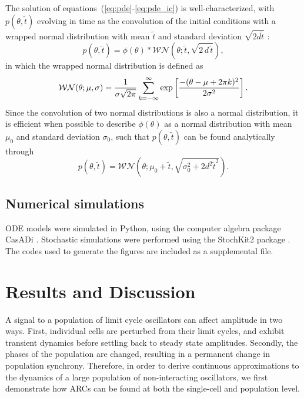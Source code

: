 The solution of equations~(\ref{eq:pde}-\ref{eq:pde_ic}) is well-characterized, with $p(\theta, \tilde{t})$ evolving in time as the convolution of the initial conditions with a wrapped normal distribution with mean $\tilde{t}$ and standard deviation $\sqrt{2d\tilde{t}}$ \cite{Chirikjian2009}:
\begin{equation}
  p(\theta, \tilde{t}) = \phi(\theta) * \mathcal{WN}(\theta; \tilde{t},
  \sqrt{2\, d\, \tilde{t}}),
\end{equation}
in which the wrapped normal distribution \cite{Mardia2009} is defined as
\begin{equation}
  {\cal WN}(\theta; \mu, \sigma) =
  \frac{1}{\sigma\sqrt{2\pi}}\sum_{k=-\infty}^\infty \exp\left[\frac{-(\theta
  - \mu + 2\pi k)^2}{2\sigma^2}\right].
  \label{eq:wrapped_normal}
\end{equation}
Since the convolution of two normal distributions is also a normal distribution, it is efficient when possible to describe $\phi(\theta)$ as a normal distribution with mean $\mu_0$ and standard deviation $\sigma_0$, such that $p(\theta, \tilde{t})$ can be found analytically through
\begin{equation}
  p(\theta, \tilde{t}) = \mathcal{WN}(\theta; \mu_0 + \tilde{t},
  \sqrt{\sigma_0^2 + 2d^2\tilde{t}^2}).
\end{equation}

\subsection{Numerical simulations}

ODE models were simulated in Python, using the computer algebra package CasADi \cite{Andersson2013b}.
Stochastic simulations were performed using the StochKit2 package \cite{Sanft2011a}.
The codes used to generate the figures are included as a supplemental file.

\section{Results and Discussion}

A signal to a population of limit cycle oscillators can affect amplitude in two ways.
First, individual cells are perturbed from their limit cycles, and exhibit transient dynamics before settling back to steady state amplitudes.
Secondly, the phases of the population are changed, resulting in a permanent change in population synchrony.
Therefore, in order to derive continuous approximations to the dynamics of a large population of non-interacting oscillators, we first demonstrate how ARCs can be found at both the single-cell and population level.

